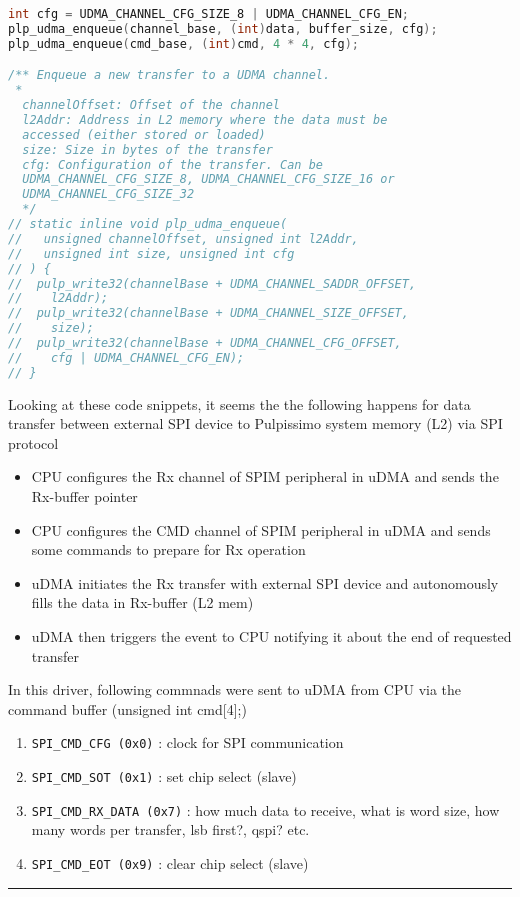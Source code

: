 \documentclass{article}
\begin{document}
\begin{lstlisting}[language=C]
int cfg = UDMA_CHANNEL_CFG_SIZE_8 | UDMA_CHANNEL_CFG_EN;
plp_udma_enqueue(channel_base, (int)data, buffer_size, cfg);
plp_udma_enqueue(cmd_base, (int)cmd, 4 * 4, cfg);

/** Enqueue a new transfer to a UDMA channel.
 *
  channelOffset: Offset of the channel
  l2Addr: Address in L2 memory where the data must be
  accessed (either stored or loaded)
  size: Size in bytes of the transfer
  cfg: Configuration of the transfer. Can be
  UDMA_CHANNEL_CFG_SIZE_8, UDMA_CHANNEL_CFG_SIZE_16 or
  UDMA_CHANNEL_CFG_SIZE_32
  */
// static inline void plp_udma_enqueue(
//   unsigned channelOffset, unsigned int l2Addr,
//   unsigned int size, unsigned int cfg
// ) {
//  pulp_write32(channelBase + UDMA_CHANNEL_SADDR_OFFSET,
//    l2Addr);
//  pulp_write32(channelBase + UDMA_CHANNEL_SIZE_OFFSET,
//    size);
//  pulp_write32(channelBase + UDMA_CHANNEL_CFG_OFFSET,
//    cfg | UDMA_CHANNEL_CFG_EN);
// }

\end{lstlisting}
%
Looking at these code snippets, it seems the the following happens for data transfer between external SPI device
to Pulpissimo system memory (L2) via SPI protocol
\begin{itemize}
 \item CPU configures the Rx channel of SPIM peripheral in uDMA and sends the Rx-buffer pointer
 \item CPU configures the CMD channel of SPIM peripheral in uDMA and sends some commands to prepare for Rx operation
 \item uDMA initiates the Rx transfer with external SPI device and autonomously fills the data in Rx-buffer (L2 mem)
 \item uDMA then triggers the event to CPU notifying it about the end of requested transfer
\end{itemize}
In this driver, following commnads were sent to uDMA from CPU via the command buffer (unsigned int cmd[4];)
\begin{enumerate}
 \item \texttt{SPI\_CMD\_CFG (0x0)} : clock for SPI communication
 \item \texttt{SPI\_CMD\_SOT (0x1)} : set chip select (slave)
 \item \texttt{SPI\_CMD\_RX\_DATA (0x7)} : how much data to receive, what is word size, how many words per transfer,
       lsb first?, qspi? etc.
 \item \texttt{SPI\_CMD\_EOT (0x9)} : clear chip select (slave)
\end{enumerate}
%
\noindent \rule[0.5ex]{\linewidth}{1pt}
\end{document}
